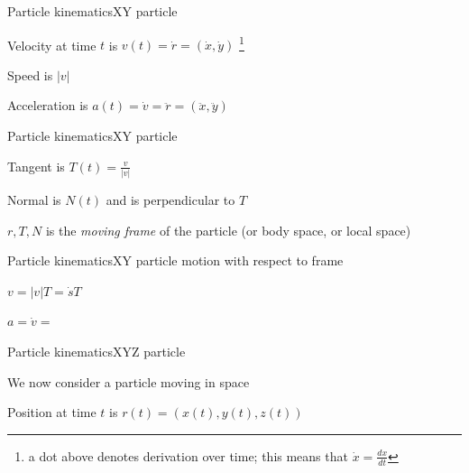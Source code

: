 \documentclass{beamer}
\begin{document}
\begin{slide}{Particle kinematics}{XY particle}{
\item Velocity at time $t$ is $v(t) = \dot r = (\dot x,\dot y)$ \footnote{a dot above denotes derivation over time; this means that $\dot x = \frac{dx}{dt}$}
\item Speed is $|v|$
\item Acceleration is $a(t) = \dot v = \ddot r  = (\ddot x, \ddot y)$
}\end{slide}

\begin{slide}{Particle kinematics}{XY particle}{
\item Tangent is $T(t) = \frac{v}{|v|}$ %
\item Normal is $N(t)$ and is perpendicular to $T$ %
\item $r,T,N$ is the \textit{moving frame} of the particle (or body space, or local space)
}\end{slide}

\begin{slide}{Particle kinematics}{XY particle motion with respect to frame}{
\item $v = |v|T = \dot s T$
\item $a = \dot v =$ %
}\end{slide}

\begin{slide}{Particle kinematics}{XYZ particle}{
\item We now consider a particle moving in space
\item Position at time $t$ is $r(t) = (x(t),y(t),z(t))$ %
}\end{slide}
\end{document}
